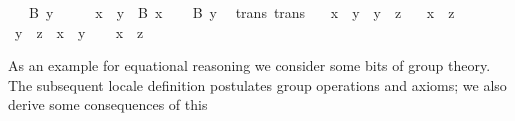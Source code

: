 \begin{isabellebody}
\ \ \ {}B\ y{}\isanewline
%
\isadelimproof
%
\endisadelimproof
%
\isatagproof
{}\isamarkupfalse%
\ {}\isanewline
\ \ \isamarkupfalse%
\ {}x\ {}\ y{}\ \ {}B\ x{}\isanewline
\ \ \isamarkupfalse%
\ {}B\ y{}\ \isamarkupfalse%
\isanewline
{}\isamarkupfalse%
%
\endisatagproof
{\isafoldproof}%
%
\isadelimproof
\isanewline
%
\endisadelimproof
\isanewline
{}\isamarkupfalse%
\ trans\ {}trans{}{}\isanewline
\ \ \ {}x\ {}\ y{}\ \ {}y\ {}\ z{}\isanewline
\ \ \ {}x\ {}\ z{}\isanewline
%
\isadelimproof
%
\endisadelimproof
%
\isatagproof
{}\isamarkupfalse%
\ {}\isanewline
\ \ \isamarkupfalse%
\ {}y\ {}\ z{}\ \ {}x\ {}\ y{}\isanewline
\ \ \isamarkupfalse%
\ {}x\ {}\ z{}\ \isamarkupfalse%
\isanewline
{}\isamarkupfalse%
%
\endisatagproof
{\isafoldproof}%
%
\isadelimproof
%
\endisadelimproof
%
\isamarkuptrue%
%
\begin{isamarkuptext}%
As an example for equational reasoning we consider some bits of
  group theory.  The subsequent locale definition postulates group
  operations and axioms; we also derive some consequences of this

\end{isamarkuptext}
\end{isabellebody}
